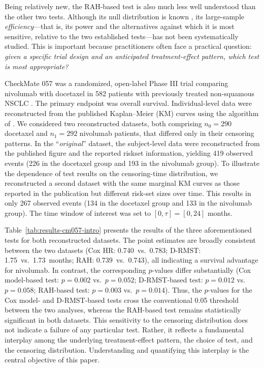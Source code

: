 \documentclass[12pt]{article}
\newcommand{\CoxHROriginal}{0.740}
\newcommand{\CoxHRSensitivity}{0.783}
\newcommand{\CoxPOriginal}{0.002}
\newcommand{\CoxPSensitivity}{0.052}
\newcommand{\DrmstOriginal}{1.75}
\newcommand{\DrmstSensitivity}{1.73}
\newcommand{\DrmstPOriginal}{0.012}
\newcommand{\DrmstPSensitivity}{0.058}
\newcommand{\RahOriginal}{0.739}
\newcommand{\RahSensitivity}{0.743}
\newcommand{\RahPOriginal}{0.003}
\newcommand{\RahPSensitivity}{0.014}
\begin{document}
Being relatively new, the RAH-based test is also much less well understood than the other two tests. Although its null distribution is known \citep{Uno2023}, its large-sample \emph{efficiency}—that is, its power and the alternatives against which it is most sensitive, relative to the two established tests—has not been systematically studied. This is important because practitioners often face a practical question: \emph{given a specific trial design and an anticipated treatment-effect pattern, which test is most appropriate?}



CheckMate 057 was a randomized, open-label Phase III trial comparing nivolumab with docetaxel in 582 patients with previously treated non-squamous NSCLC \citep{Borghaei2015}. The primary endpoint was overall survival. Individual-level data were reconstructed from the published Kaplan--Meier (KM) curves using the algorithm of \cite{Guyot2012}.
We considered two reconstructed datasets, both comprising $n_0=290$ docetaxel and $n_1=292$ nivolumab patients, that differed only in their censoring patterns. In the ``\emph{original}'' dataset, the subject-level data were reconstructed from the published figure and the reported riskset information, yielding 419 observed events (226 in the docetaxel group and 193 in the nivolumab group). To illustrate the dependence of test results on the censoring-time distribution, we reconstructed a second dataset with the same marginal KM curves as those reported in the publication but different risk-set sizes over time. This results in only 267 observed events (134 in the docetaxel group and 133 in the nivolumab group). The time window of interest was set to $[0,\tau]=[0,24]$ months.


Table~\ref{tab:results-cm057-intro} presents the results of the three aforementioned tests for both reconstructed datasets. The point estimates are broadly consistent between the two datasets (Cox HR: \CoxHROriginal\ vs.\ \CoxHRSensitivity; D-RMST: \DrmstOriginal\ vs.\ \DrmstSensitivity\ months; RAH: \RahOriginal\ vs.\ \RahSensitivity), all indicating a survival advantage for nivolumab. In contrast, the corresponding $p$-values differ substantially (Cox model-based test: $p=\CoxPOriginal$ vs.\ $p=\CoxPSensitivity$; D-RMST-based test: $p=\DrmstPOriginal$ vs.\ $p=\DrmstPSensitivity$; RAH-based test: $p=\RahPOriginal$ vs.\ $p=\RahPSensitivity$). Thus, the $p$-values for the Cox model- and D-RMST-based tests cross the conventional 0.05 threshold between the two analyses, whereas the RAH-based test remains statistically significant in both datasets. This sensitivity to the censoring distribution does not indicate a failure of any particular test. Rather, it reflects a fundamental interplay among the underlying treatment-effect pattern, the choice of test, and the censoring distribution. Understanding and quantifying this interplay is the central objective of this paper.
\end{document}
